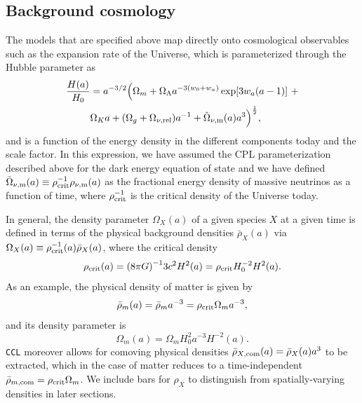 \documentclass[\docopts]{\docclass}
\newcommand{\ccl}{{\tt CCL}\xspace}
\begin{document}


\subsection{Background cosmology}

The models that are specified above map directly onto cosmological observables such as the expansion rate of the Universe, which is parameterized through the Hubble parameter as
\begin{align}\label{eq:Ha}
\frac{H(a)}{H_0} &= a^{-3/2}\Big(\Omega_{m}+\Omega_{\Lambda} a^{-3(w_0+w_a)}
\exp[3 w_a (a-1)]~+ \nonumber \\ &\Omega_{K} a + (\Omega_{g} + \Omega_{\nu, {\rm rel}}) a^{-1} + \tilde\Omega_{\nu, {\rm m}}(a)a^3\Big)^{\frac{1}{2}} ,
\end{align}
and is a function of the energy density in the different components today and the scale factor. In this expression, we have assumed the CPL parameterization described above for the dark energy equation of state and we have defined $\tilde\Omega_{\nu, {\rm m}}(a) \equiv \rho^{-1}_{\rm crit} \rho_{\nu, {\rm m}}(a)$ as the fractional energy density of massive neutrinos as a function of time, where $\rho^{-1}_{\rm crit}$ is the critical density of the Universe today.

In general, the density parameter $\Omega_X(a)$ of a given species $X$ at a given time is defined in terms of the physical background densities $\bar\rho_X(a)$ via $\Omega_X(a) \equiv \rho^{-1}_{\rm crit}(a) \bar\rho_X(a)$, where the critical density
\begin{equation}
  \rho_{\rm crit}(a) = {( 8 \pi G)}^{-1} 3c^2H^2(a) = \rho_{\rm crit} H_0^{-2} H^2(a).
  \label{eq:rhocrit}
\end{equation}
As an example, the physical density of matter is given by
\begin{equation}
  \bar\rho_m(a) = \bar\rho_{m} a^{-3} = \rho_{\rm crit} \Omega_{m} a^{-3},
\end{equation}
and its density parameter is
\begin{equation}
  \Omega_m(a) = \Omega_{m} H_0^{2} a^{-3} H^{-2}(a).
\end{equation}
\ccl moreover allows for comoving physical densities $\bar\rho_{X, {\rm com}}(a) = \bar\rho_X(a) a^3$ to be extracted, which in the case of matter reduces to a time-independent $\bar\rho_{m, {\rm com}} = \rho_{\rm crit} \Omega_{m}$. We include bars for $\rho_X$ to distinguish from spatially-varying densities in later sections.
\end{document}
